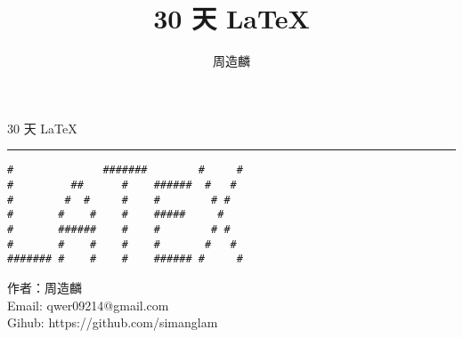 \documentclass[10pt, a5paper, twoside]{NGPLB}
\author{周造麟}
\title{30 天 LaTeX}
\begin{document}
\begin{titlepage}
{
\color{fpft}
\pagecolor{fpbg}
{\Huge 30 天 \LaTeX\vskip6pt}
\hrule
\vfill
\begin{center}
\begin{minipage}{0.6\textwidth}
\begin{verbatim}
#              #######        #     # 
#         ##      #    ######  #   #  
#        #  #     #    #        # #   
#       #    #    #    #####     #    
#       ######    #    #        # #   
#       #    #    #    #       #   #  
####### #    #    #    ###### #     # 
\end{verbatim}
\end{minipage}
\end{center}
\vfill
\begin{flushright}
作者：周造麟\\
Email: qwer09214@gmail.com\\
Gihub: https://github.com/simanglam
\end{flushright}
}
\end{titlepage}
\newpage\pagecolor{white}
\tableofcontents\newpage{}
\newpage
\newpage
\newpage
\newpage
\newpage
\newpage
\newpage
\newpage
\newpage
\newpage
\newpage
\newpage
\newpage
\newpage
\newpage
\newpage
\newpage
\newpage
\newpage
\newpage
\newpage
\newpage
\newpage
\newpage
\newpage
\newpage
\newpage
\newpage
\newpage
\newpage
{}
\end{document}
